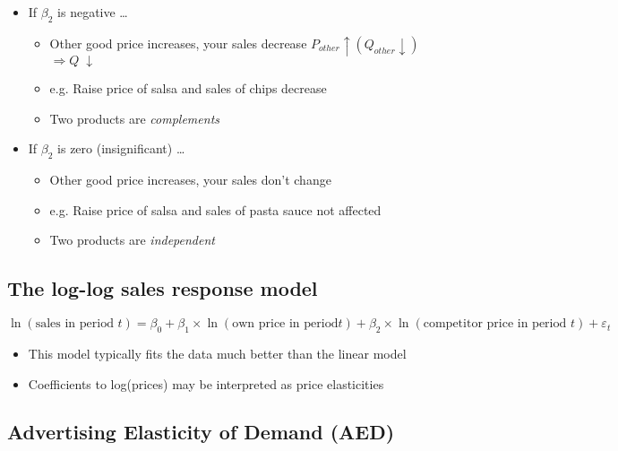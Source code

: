 \documentclass[10pt,article]{article}
\begin{document}
\begin{itemize}
\item If \(\beta_2\) is negative \ldots{}
\begin{itemize}
\item Other good price increases, your sales  decrease
 \( P_{other} \uparrow (Q_{other} \downarrow) \)  \( \Rightarrow Q\;\downarrow \)
\item e.g. Raise price of salsa and sales of chips decrease
\item Two products are \emph{complements}
\end{itemize}
\end{itemize}

\begin{itemize}
\item If \(\beta_2\) is zero (insignificant) \ldots{}
\begin{itemize}
\item Other good price increases, your sales  don't change
\item e.g. Raise price of salsa and sales of pasta sauce not affected
\item Two products are \emph{independent}
\end{itemize}
\end{itemize}
\subsection{The log-log sales response model}
\label{sec:org7dd24dc}
\iffalse
\begin{align*}
\ln(\text{sales in period } t) = \beta_0 + \beta_1 & \times \ln(\text{own
price in period } t) \\
                + \beta_2 & \times \ln(\text{competitor price in period } t)  + \varepsilon_t
\end{align*}
\fi

\[ \ln(\text{sales in period } t) = \beta_0 + \beta_1 \times \ln(\text{own
    price in period} t) + 
   \beta_2 \times \ln(\text{competitor price in period } t)  + \varepsilon_t
\]
\begin{itemize}
\item This model typically fits the data much better than the linear model
\item Coefficients to log(prices) may be interpreted as price elasticities
\end{itemize}
\subsection{Advertising Elasticity of Demand (AED)}
\label{sec:orgf844fc8}
\end{document}
